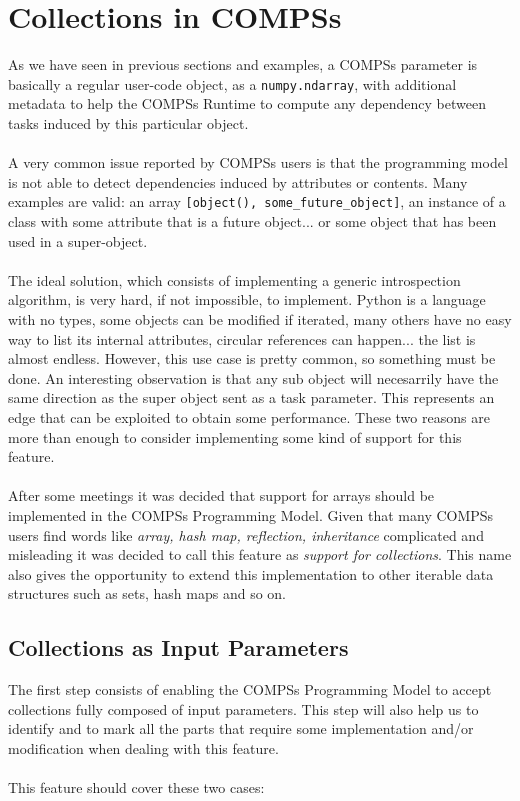 \section{Collections in COMPSs}
\label{sec:col}
As we have seen in previous sections and examples, a COMPSs parameter is basically a regular user-code object, as a \verb|numpy.ndarray|, with additional metadata to help the COMPSs Runtime to compute any dependency between tasks induced by this particular object.\\
\\
A very common issue reported by COMPSs users is that the programming model is not able to detect dependencies induced by attributes or contents. Many examples are valid: an array \verb|[object(), some_future_object]|, an instance of a class with some attribute that is a future object... or some object that has been used in a super-object.\\
\\
The ideal solution, which consists of implementing a generic introspection algorithm, is very hard, if not impossible, to implement. Python is a language with no types, some objects can be modified if iterated, many others have no easy way to list its internal attributes, circular references can happen... the list is almost endless. However, this use case is pretty common, so something must be done. An interesting observation is that any sub object will necesarrily have the same direction as the super object sent as a task parameter. This represents an edge that can be exploited to obtain some performance. These two reasons are more than enough to consider implementing some kind of support for this feature.\\
\\
After some meetings it was decided that support for arrays should be implemented in the COMPSs Programming Model. Given that many COMPSs users find words like \textit{array, hash map, reflection, inheritance} complicated and misleading it was decided to call this feature as \textit{support for collections}. This name also gives the opportunity to extend this implementation to other iterable data structures such as sets, hash maps and so on.\\

\subsection{Collections as Input Parameters}
\label{subsec:col_in}
The first step consists of enabling the COMPSs Programming Model to accept collections fully composed of input parameters. This step will also help us to identify and to mark all the parts that require some implementation and/or modification when dealing with this feature.\\
\\
This feature should cover these two cases:


